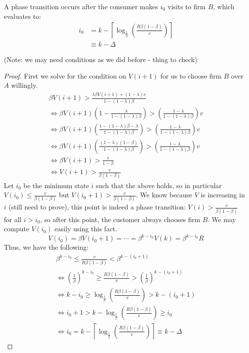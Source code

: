 \documentclass[12pt, a4paper]{article}
\begin{document}
\begin{theorem} A phase transition occurs after the consumer makes $i_0$ visits to firm $B$, which evaluates to:
\begin{align*}
i_0 &= k - \left\lceil{\log_{\frac{1}{\beta}}\left(\frac{R\beta(1-\beta)}{v} \right)}\right\rceil \\
&\equiv k-\Delta
\end{align*}
\end{theorem}

(Note: we may need conditions as we did before - thing to check)

\begin{proof}
First we solve for the condition on $V(i+1)$ for us to choose firm $B$ over $A$ willingly.
\begin{gather*}
\beta V(i+1) > \frac{\lambda \beta V(i+1) + (1-\lambda)v}{1-(1-\lambda)\beta} \\
\iff \beta V(i+1) \left(1-\frac{\lambda}{1-(1-\lambda)\beta} \right) > \left(\frac{1-\lambda}{1-(1-\lambda)\beta} \right) v \\
\iff \beta V(i+1) \left(\frac{1-(1-\lambda)\beta -\lambda}{1-(1-\lambda)\beta} \right) > \left(\frac{1-\lambda}{1-(1-\lambda)\beta} \right) v \\
\iff \beta V(i+1) \left(\frac{(1-\lambda)(1-\beta)}{1-(1-\lambda)\beta} \right) > \left(\frac{1-\lambda}{1-(1-\lambda)\beta} \right) v \\
\iff \beta V(i+1) > \frac{v}{1-\beta} \\
\iff V(i+1) > \frac{v}{\beta(1-\beta)}
\end{gather*}
Let $i_0$ be the minimum state $i$ such that the above holds, so in particular $V(i_0) \le \frac{v}{\beta(1-\beta)}$ but $V(i_0+1) > \frac{v}{\beta(1-\beta)}$. We know because $V$ is increasing in $i$ (still need to prove), this point is indeed a phase transition: $V(i) > \frac{v}{\beta(1-\beta)}$ for all $i > i_0$, so after this point, the customer always chooses firm $B$. We may compute $V(i_0)$ easily using this fact.
\begin{equation*}
V(i_0) = \beta V(i_0+1) = \cdots = \beta^{k-i_0}V(k) = \beta^{k-i_0}R
\end{equation*}
Thus, we have the following:
\begin{gather*}
\beta^{k-i_0} \le \frac{v}{R\beta(1-\beta)} < \beta^{k-(i_0+1)} \\ 
\iff \left(\frac{1}{\beta}\right)^{k-i_0} \ge \frac{R\beta(1-\beta)}{v} > \left(\frac{1}{\beta}\right)^{k-(i_0+1)} \\ 
\iff k-i_0 \ge \log_{\frac{1}{\beta}}\left(\frac{R\beta(1-\beta)}{v} \right) > k-(i_0+1) \\
\iff i_0 + 1 > k - \log_{\frac{1}{\beta}}\left(\frac{R\beta(1-\beta)}{v} \right) \ge i_0\\
\iff i_0 = k - \left\lceil \log_{\frac{1}{\beta}}\left(\frac{R\beta(1-\beta)}{v} \right) \right\rceil \equiv k-\Delta
\end{gather*}
\end{proof}
\end{document}
